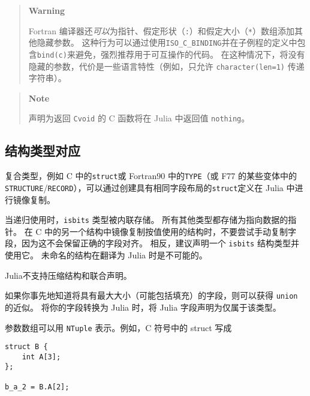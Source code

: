 \begin{quote}
\textbf{Warning}

Fortran 编译器还\emph{可以}为指针、假定形状（\texttt{:}）和假定大小（\texttt{*}）数组添加其他隐藏参数。 这种行为可以通过使用\texttt{ISO\_C\_BINDING}并在子例程的定义中包含\texttt{bind(c)}来避免，强烈推荐用于可互操作的代码。 在这种情况下，将没有隐藏的参数，代价是一些语言特性（例如，只允许 \texttt{character(len=1)} 传递字符串）。

\end{quote}


\begin{quote}
\textbf{Note}

声明为返回 \texttt{Cvoid} 的 C 函数将在 Julia 中返回值 \texttt{nothing}。

\end{quote}


\hypertarget{15288158452444609990}{}


\subsection{结构类型对应}



复合类型，例如 C 中的\texttt{struct}或 Fortran90 中的\texttt{TYPE}（或 F77 的某些变体中的\texttt{STRUCTURE}/\texttt{RECORD}），可以通过创建具有相同字段布局的\texttt{struct}定义在 Julia 中进行镜像复制。



当递归使用时，\texttt{isbits} 类型被内联存储。 所有其他类型都存储为指向数据的指针。 在 C 中的另一个结构中镜像复制按值使用的结构时，不要尝试手动复制字段，因为这不会保留正确的字段对齐。 相反，建议声明一个 \texttt{isbits} 结构类型并使用它。 未命名的结构在翻译为 Julia 时是不可能的。



Julia不支持压缩结构和联合声明。



如果你事先地知道将具有最大大小（可能包括填充）的字段，则可以获得 \texttt{union} 的近似。 将你的字段转换为 Julia 时，将 Julia 字段声明为仅属于该类型。



参数数组可以用 \texttt{NTuple} 表示。例如，C 符号中的 struct 写成




\begin{lstlisting}
struct B {
    int A[3];
};

b_a_2 = B.A[2];
\end{lstlisting}



